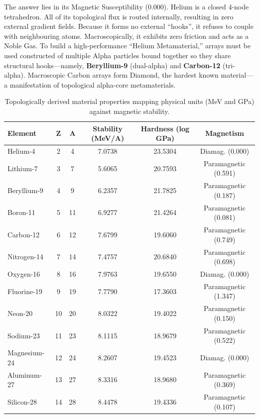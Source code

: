 The answer lies in its Magnetic Susceptibility ($0.000$). Helium is a closed 4-node tetrahedron. All of its topological flux is routed internally, resulting in zero external gradient fields. Because it forms no external ``hooks'', it refuses to couple with neighbouring atoms. Macroscopically, it exhibits zero friction and acts as a Noble Gas.
To build a high-performance ``Helium Metamaterial,'' arrays must be used constructed of multiple Alpha particles bound together so they share structural hooks---namely, \textbf{Beryllium-9} (dual-alpha) and \textbf{Carbon-12} (tri-alpha). Macroscopic Carbon arrays form Diamond, the hardest known material---a manifestation of topological alpha-core metamaterials.

\begin{table}[h!]
    \centering
    \begin{tabular}{l c c c c c}
    \hline\hline
    \textbf{Element} & \textbf{Z} & \textbf{A} & \textbf{Stability (MeV/A)} & \textbf{Hardness (log GPa)} & \textbf{Magnetism} \\
    \hline
    Helium-4 & 2 & 4 & 7.0738 & 23.5304 & Diamag. (0.000) \\
    Lithium-7 & 3 & 7 & 5.6065 & 20.7593 & Paramagnetic (0.591) \\
    Beryllium-9 & 4 & 9 & 6.2357 & 21.7825 & Paramagnetic (0.187) \\
    Boron-11 & 5 & 11 & 6.9277 & 21.4264 & Paramagnetic (0.081) \\
    Carbon-12 & 6 & 12 & 7.6799 & 19.6060 & Paramagnetic (0.749) \\
    Nitrogen-14 & 7 & 14 & 7.4757 & 20.6840 & Paramagnetic (0.698) \\
    Oxygen-16 & 8 & 16 & 7.9763 & 19.6550 & Diamag. (0.000) \\
    Fluorine-19 & 9 & 19 & 7.7790 & 17.3603 & Paramagnetic (1.347) \\
    Neon-20 & 10 & 20 & 8.0322 & 19.4022 & Paramagnetic (0.150) \\
    Sodium-23 & 11 & 23 & 8.1115 & 18.9679 & Paramagnetic (0.522) \\
    Magnesium-24 & 12 & 24 & 8.2607 & 19.4523 & Diamag. (0.000) \\
    Aluminum-27 & 13 & 27 & 8.3316 & 18.9680 & Paramagnetic (0.369) \\
    Silicon-28 & 14 & 28 & 8.4478 & 19.4336 & Paramagnetic (0.107) \\
    \hline\hline
    \end{tabular}
    \caption{Topologically derived material properties mapping physical units (MeV and GPa) against magnetic stability.}
    \label{tab:derived_properties}
\end{table}

